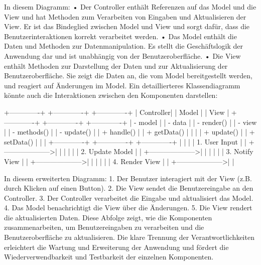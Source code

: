 In diesem Diagramm:
•	Der Controller enthält Referenzen auf das Model und die View und hat Methoden zum Verarbeiten von Eingaben und Aktualisieren der View. Er ist das Bindeglied zwischen Model und View und sorgt dafür, dass die Benutzerinteraktionen korrekt verarbeitet werden.
•	Das Model enthält die Daten und Methoden zur Datenmanipulation. Es stellt die Geschäftslogik der Anwendung dar und ist unabhängig von der Benutzeroberfläche.
•	Die View enthält Methoden zur Darstellung der Daten und zur Aktualisierung der Benutzeroberfläche. Sie zeigt die Daten an, die vom Model bereitgestellt werden, und reagiert auf Änderungen im Model.
Ein detaillierteres Klassendiagramm könnte auch die Interaktionen zwischen den Komponenten darstellen:

+-------------+       +-------------+       +-------------+
|   Controller|       |     Model   |       |     View    |
+-------------+       +-------------+       +-------------+
| - model     |       | - data      |       | - render()  |
| - view      |       | - methods() |       | - update()  |
| + handle()  |       | + getData() |       |             |
| + update()  |       | + setData() |       |             |
+-------------+       +-------------+       +-------------+
       |                     |                     |
       | 1. User Input       |                     |
       +-------------------->|                     |
       |                     |                     |
       | 2. Update Model     |                     |
       +-------------------->|                     |
       |                     |                     |
       | 3. Notify View      |                     |
       +-------------------->|                     |
       |                     |                     |
       | 4. Render View      |                     |
       +-------------------->|                     |

In diesem erweiterten Diagramm:
1.	Der Benutzer interagiert mit der View (z.B. durch Klicken auf einen Button).
2.	Die View sendet die Benutzereingabe an den Controller.
3.	Der Controller verarbeitet die Eingabe und aktualisiert das Model.
4.	Das Model benachrichtigt die View über die Änderungen.
5.	Die View rendert die aktualisierten Daten.
Diese Abfolge zeigt, wie die Komponenten zusammenarbeiten, um Benutzereingaben zu verarbeiten und die Benutzeroberfläche zu aktualisieren. Die klare Trennung der Verantwortlichkeiten erleichtert die Wartung und Erweiterung der Anwendung und fördert die Wiederverwendbarkeit und Testbarkeit der einzelnen Komponenten.
